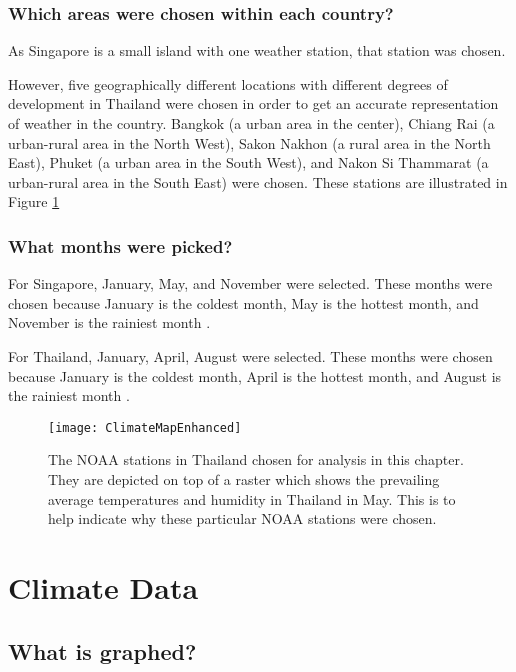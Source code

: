 \subsubsection{Which areas were chosen within each country?}

As Singapore is a small island with one weather station, that station was chosen. 

However, five geographically different locations with different degrees of development in Thailand were chosen in order to get an accurate representation of weather in the country. Bangkok (a urban area in the center), Chiang Rai (a urban-rural area in the North West), Sakon Nakhon (a rural area in the North East), Phuket (a urban area in the South West), and Nakon Si Thammarat (a urban-rural area in the South East) were chosen. These stations are illustrated in Figure \ref{fig:stationsmap}

\subsubsection{What months were picked?}

For Singapore, January, May, and November were selected. These months were chosen because January is the coldest month, May is the hottest month, and November is the rainiest month \citep{singaporeweather}. 

For Thailand, January, April, August were selected. These months were chosen because January is the coldest month, April is the hottest month, and August is the rainiest month \citep{thailandweather}. 

\begin{figure}
  \texttt{[image: ClimateMapEnhanced]}
  \caption{The NOAA stations in Thailand chosen for analysis in this chapter. They are depicted on top of a raster which shows the prevailing average temperatures and humidity in Thailand in May. This is to help indicate why these particular NOAA stations were chosen.}
  \label{fig:stationsmap}
\end{figure}

\section{Climate Data}

\subsection{What is graphed?}


